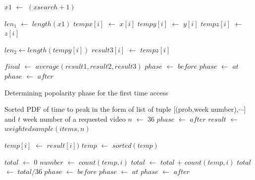 \documentclass[10pt,final,journal,a4paper]{IEEEtran}
\begin{document}
\begin{algorithm}
\begin{algorithmic}[1]

\STATE $x1$ $\leftarrow$ $(xsearch + 1)$ 

\STATE $len_1$ $\leftarrow$ $length(x1)$
\STATE $tempx[i]$ $\leftarrow$ $x[i]$
\STATE $tempy[i]$ $\leftarrow$ $y[i]$
\STATE $tempz[i]$ $\leftarrow$ $z[i]$
\ENDIF
\ENDFOR

\STATE $len_2 \leftarrow length(tempy[i])$
    \STATE $result3[i]$ $\leftarrow$ $tempz[i]$ 
    \ENDIF
\ENDFOR


\STATE $final$ $\leftarrow$ $average(result1,result2,result3)$
\STATE $phase$ $\leftarrow$ $before$
\STATE $phase$ $\leftarrow$ $at$
\ELSE
\STATE $phase$ $\leftarrow$ $after$
\ENDIF

\end{algorithmic}
\end{algorithm}




\begin{algorithm}
\caption{Determining popolarity phase for the first time access}
\label{alg3}
\begin{algorithmic}[2]
\REQUIRE Sorted PDF of time to peak in the form of list of tuple [(prob,week number),$\cdots$] and $t$ week number of a requested video
\STATE $n$ $\leftarrow$ $36$ 
\STATE $phase$ $\leftarrow$ $after$
\ELSE
\STATE $result$ $\leftarrow$ $weightedsample(items,n)$
\ENDIF

\STATE $temp[i]$ $\leftarrow$ $result[i])$ 
\ENDFOR
\STATE $temp$ $\leftarrow$ $sorted(temp)$  

\STATE $total$ $\leftarrow$ $0$
\STATE $number$ $\leftarrow$ $count(temp,i)$ 
\STATE $total$ $\leftarrow$ $total$ $+$ $count(temp,i)$ 
\ENDFOR
\STATE $total$ $\leftarrow$ $total/36$ 
\STATE $phase$ $\leftarrow$ $before$
\STATE $phase$ $\leftarrow$ $at$ 
\ELSE
\STATE $phase$ $\leftarrow$ $after$ 
\ENDIF

\end{algorithmic}
\end{algorithm}
\end{document}
